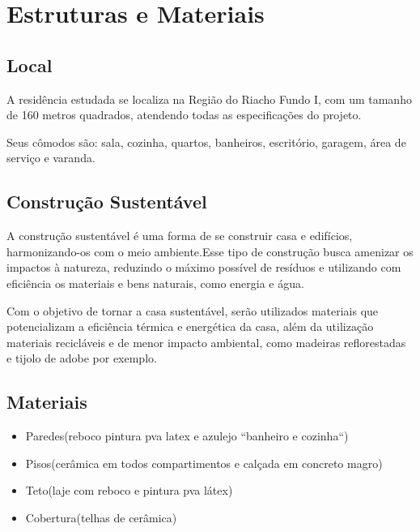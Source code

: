     \section{Estruturas e Materiais}
        \subsection{Local}
            \par A residência estudada se localiza na Região do Riacho Fundo I, com um tamanho de 160 metros quadrados, atendendo todas as especificações do projeto. 
            \par Seus cômodos são: sala, cozinha, quartos, banheiros, escritório, garagem, área de serviço e varanda.
            
        \subsection{Construção Sustentável}
            \par A construção sustentável é uma forma de se construir casa e edifícios, harmonizando-os com o meio ambiente.Esse tipo de construção busca amenizar os impactos à natureza, reduzindo o máximo possível de resíduos e utilizando com eficiência os materiais e bens naturais, como energia e água. \cite{ecycle}
	           \par Com o objetivo de tornar a casa sustentável, serão utilizados materiais que potencializam a eficiência térmica e energética da casa, além da utilização materiais recicláveis e de menor impacto ambiental, como madeiras reflorestadas e tijolo de adobe por exemplo.
	           
	   \subsection{Materiais}
	       \begin{itemize}
	           \item Paredes(reboco pintura pva latex e azulejo “banheiro e cozinha“)
	           \item Pisos(cerâmica em todos compartimentos e calçada em concreto magro)
	           \item Teto(laje com reboco e pintura pva látex)
	           \item Cobertura(telhas de cerâmica)
	       \end{itemize}
	        
